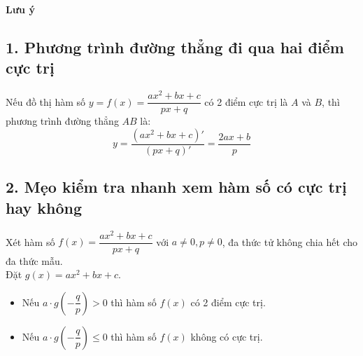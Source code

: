 \documentclass[12pt,a4paper]{extarticle}
\begin{document}
\vspace{2em}

\noindent\textbf{\Large\color{blue}Lưu ý}

\subsection*{1. Phương trình đường thẳng đi qua hai điểm cực trị}

\begin{doublelinebox}
    Nếu đồ thị hàm số $y = f(x) = \dfrac{ax^2 + bx + c}{px + q}$ có 2 điểm cực trị là $A$ và $B$, thì phương trình đường thẳng $AB$ là:
    \[
    y = \frac{(ax^2 + bx + c)'}{(px + q)'} = \frac{2ax + b}{p}
    \]
\end{doublelinebox}



\subsection*{2. Mẹo kiểm tra nhanh xem hàm số có cực trị hay không}
\begin{doublelinebox}
    Xét hàm số $f(x) = \dfrac{ax^2 + bx + c}{px + q}$ với $a \neq 0, p \neq 0$, đa thức tử không chia hết cho đa thức mẫu.\\
    Đặt $g(x) = ax^2 + bx + c$.
    \begin{itemize}[leftmargin=*, label=\color{blue}$\bullet$, itemsep=0.5em]
        \item Nếu $a \cdot g\left(-\dfrac{q}{p}\right) > 0$ thì hàm số $f(x)$ có 2 điểm cực trị.
        \item Nếu $a \cdot g\left(-\dfrac{q}{p}\right) \le 0$ thì hàm số $f(x)$ không có cực trị.
    \end{itemize}
\end{doublelinebox}
\end{document}
